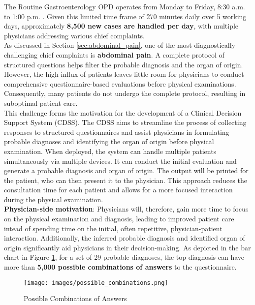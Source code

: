 \noindent The Routine Gastroenterology OPD operates from Monday to Friday, 8:30 a.m. to 1:00 p.m. \cite{AIIMSOPD}. Given this limited time frame of 270 minutes daily over 5 working days, approximately \textcolor{TUMRed}{\textbf{8,500 new cases are handled per day}}, with multiple physicians addressing various chief complaints.\\[\baselineskip]

\noindent As discussed in Section \ref{sec:abdominal_pain}, one of the most diagnostically challenging chief complaints is \textcolor{TUMRed}{\textbf{abdominal pain}}. A complete protocol of structured questions helps filter the probable diagnosis and the organ of origin. However, the high influx of patients leaves little room for physicians to conduct comprehensive questionnaire-based evaluations before physical examinations. Consequently, many patients do not undergo the complete protocol, resulting in suboptimal patient care.\\[\baselineskip]

\noindent This challenge forms the motivation for the development of a Clinical Decision Support System (CDSS). The CDSS aims to streamline the process of collecting responses to structured questionnaires and assist physicians in formulating probable diagnoses and identifying the organ of origin before physical examination. When deployed, the system can handle multiple patients simultaneously via multiple devices. It can conduct the initial evaluation and generate a probable diagnosis and organ of origin. The output will be printed for the patient, who can then present it to the physician. This approach reduces the consultation time for each patient and allows for a more focused interaction during the physical examination.\\[\baselineskip]

\noindent \textcolor{TUMRed}{\textbf{Physician-side motivation}}: Physicians will, therefore, gain more time to focus on the physical examination and diagnosis, leading to improved patient care intead of spending time on the initial, often repetitive, physician-patient interaction. Additionally, the inferred probable diagnosis and identified organ of origin significantly aid physicians in their decision-making. As depicted in the bar chart in Figure \ref{fig:possible_combinations}, for a set of 29 probable diagnoses, the top diagnosis can have more than \textcolor{TUMRed}{\textbf{5,000 possible combinations of answers}} to the questionnaire. 

\begin{figure}[H]
    \centering
    \texttt{[image: images/possible\_combinations.png]}
    \caption{Possible Combinations of Answers}
    \label{fig:possible_combinations}
\end{figure}

